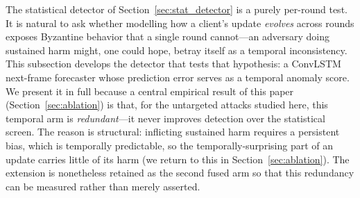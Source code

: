 \documentclass[journal]{IEEEtran}
\begin{document}
The statistical detector of Section~\ref{sec:stat_detector} is a purely per-round test. It is natural to ask whether modelling how a client's update \emph{evolves} across rounds exposes Byzantine behavior that a single round cannot---an adversary doing sustained harm might, one could hope, betray itself as a temporal inconsistency. This subsection develops the detector that tests that hypothesis: a ConvLSTM next-frame forecaster whose prediction error serves as a temporal anomaly score. We present it in full because a central empirical result of this paper (Section~\ref{sec:ablation}) is that, for the untargeted attacks studied here, this temporal arm is \emph{redundant}---it never improves detection over the statistical screen. The reason is structural: inflicting sustained harm requires a persistent bias, which is temporally predictable, so the temporally-surprising part of an update carries little of its harm (we return to this in Section~\ref{sec:ablation}). The extension is nonetheless retained as the second fused arm so that this redundancy can be measured rather than merely asserted.
\end{document}
